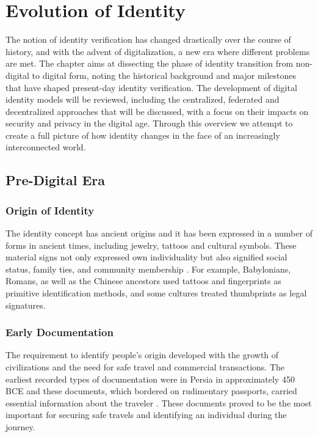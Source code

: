 \chapter{Evolution of Identity} \label{ch:identity}

The notion of identity verification has changed drastically over the course of history, and with the advent of digitalization, a new era where different
problems are met. The chapter aims at dissecting the phase of identity transition from non-digital to digital form, noting the historical background and major milestones
that have shaped present-day identity verification. The development of digital identity models will be reviewed, including the centralized, federated and decentralized 
approaches that will be discussed, with a focus on their impacts on security and privacy in the digital age. Through this overview we attempt to create a full picture 
of how identity changes in the face of an increasingly interconnected world.

\section{Pre-Digital Era}

\subsection{Origin of Identity}

The identity concept has ancient origins and it has been expressed in a number of forms in ancient times, including jewelry, tattoos and cultural symbols. These 
material signs not only expressed own individuality but also signified social status, family ties, and community membership \cite{businessreporter}. For example, Babylonians,
Romans, as well as the Chinese ancestors used tattoos and fingerprints as primitive identification methods, and some cultures treated thumbprints as legal signatures.

\subsection{Early Documentation}

The requirement to identify people's origin developed with the growth of civilizations and the need for safe travel and commercial transactions. The earliest recorded types
of documentation were in Persia in approximately 450 BCE and these documents, which bordered on rudimentary passports, carried essential information about the traveler
\cite{businessreporter}. These documents proved to be the most important for securing safe travels and identifying an individual during the journey.

